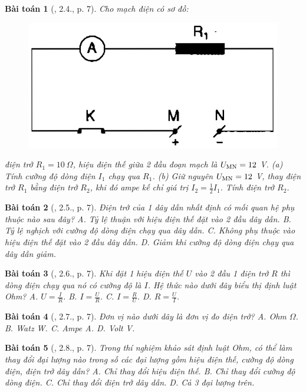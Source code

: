 \documentclass{article}
\newtheorem{baitoan}{Bài toán}
\begin{document}
\begin{baitoan}[\cite{SBT_Vat_Ly_9}, 2.4., p. 7]
	Cho mạch điện có sơ đồ:
	\begin{figure}[H]
		\centering
		\includegraphics[scale=0.25]{SBT_2.2}
	\end{figure}
	\noindent điện trở $R_1 = 10\ \Omega$, hiệu điện thế giữa 2 đầu đoạn mạch là $U_{\rm MN} = 12$ \emph{V}. (a) Tính cường độ dòng điện $I_1$ chạy qua $R_1$. (b) Giữ nguyên $U_{\rm MN} = 12$ \emph{V}, thay điện trở $R_1$ bằng điện trở $R_2$, khi đó ampe kế chỉ giá trị $I_2 = \frac{1}{2}I_1$. Tính điện trở $R_2$.
\end{baitoan}

\begin{baitoan}[\cite{SBT_Vat_Ly_9}, 2.5., p. 7]
	Điện trở của 1 dây dẫn nhất định có mối quan hệ phụ thuộc nào sau đây? {\sf A.} Tỷ lệ thuận với hiệu điện thế đặt vào 2 đầu dây dẫn. {\sf B.} Tỷ lệ nghịch với cường độ dòng điện chạy qua dây dẫn. {\sf C.} Không phụ thuộc vào hiệu điện thế đặt vào 2 đầu dây dẫn. {\sf D.} Giảm khi cường độ dòng điện chạy qua dây dẫn giảm.
\end{baitoan}

\begin{baitoan}[\cite{SBT_Vat_Ly_9}, 2.6., p. 7]
	Khi đặt 1 hiệu điện thế $U$ vào 2 đầu 1 điện trở $R$ thì dòng điện chạy qua nó có cường độ là $I$. Hệ thức nào dưới đây biểu thị định luật Ohm? {\sf A.} $U = \frac{I}{R}$. {\sf B.} $I = \frac{U}{R}$. {\sf C.} $I = \frac{R}{U}$. {\sf D.} $R = \frac{U}{I}$.
\end{baitoan}

\begin{baitoan}[\cite{SBT_Vat_Ly_9}, 2.7., p. 7]
	 Đơn vị nào dưới dây là đơn vị đo điện trở? {\sf A.} Ohm $\Omega$. {\sf B.} Watz W. {\sf C.} Ampe A. {\sf D.} Volt V.
\end{baitoan}

\begin{baitoan}[\cite{SBT_Vat_Ly_9}, 2.8., p. 7]
	Trong thí nghiệm khảo sát định luật Ohm, có thể làm thay đổi đại lượng nào trong số các đại lượng gồm hiệu điện thế, cường độ dòng điện, điện trở dây dẫn? {\sf A.} Chỉ thay đổi hiệu điện thế. {\sf B.} Chỉ thay đổi cường độ dòng điện. {\sf C.} Chỉ thay đổi điện trở dây dẫn. {\sf D.} Cả 3 đại lượng trên.
\end{baitoan}
\end{document}
